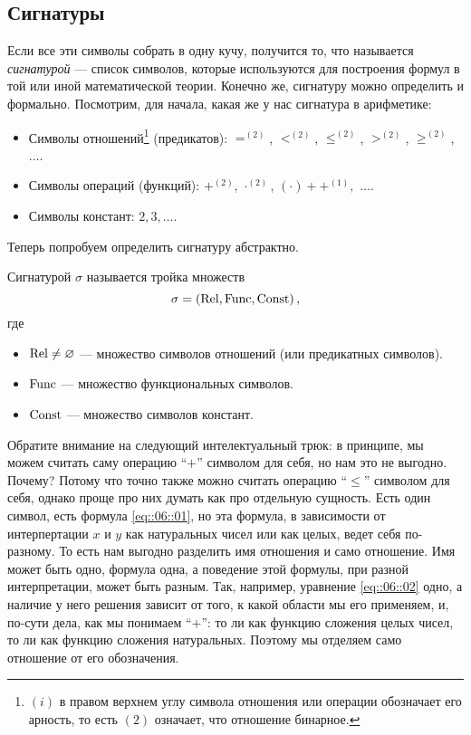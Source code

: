 \subsection{Сигнатуры}

Если все эти символы собрать в одну кучу, получится то, что называется {\it сигнатурой} --- список символов, которые используются для построения формул в той или иной математической теории.
Конечно же, сигнатуру можно определить и формально.
Посмотрим, для начала, какая же у нас сигнатура в арифметике:
\begin{itemize}
    \item Символы отношений\footnote{$(i)$ в правом верхнем углу символа отношения или операции обозначает его арность, то есть $(2)$ означает, что отношение бинарное.} (предикатов): $=^{(2)}$, $<^{(2)}$, $\leqslant^{(2)}$, $>^{(2)}$, $\geqslant^{(2)}$, $\ldots$.
    \item Символы операций (функций): $+^{(2)}$, $\cdot^{(2)}$, $(\cdot)++^{(1)},$ $\ldots$.
    \item Символы констант: $2, 3, \ldots$.
\end{itemize}
Теперь попробуем определить сигнатуру абстрактно.
\begin{definition}
    Сигнатурой $\sigma$ называется тройка множеств
    $$
        \sigma = \left(\mathrm{Rel}, \mathrm{Func}, \mathrm{Const}\right),
    $$
    где
    \begin{itemize}
        \item $\mathrm{Rel} \neq \varnothing$ --- множество символов отношений (или предикатных символов).
        \item $\mathrm{Func}$ --- множество функциональных символов.
        \item $\mathrm{Const}$ --- множество символов констант.
    \end{itemize}
\end{definition}
Обратите внимание на следующий интелектуальный трюк: в принципе, мы можем считать саму операцию \enquote{$+$} символом для себя, но нам это не выгодно.
Почему?
Потому что точно также можно считать операцию \enquote{$\leqslant$} символом для себя, однако проще про них думать как про отдельную сущность.
Есть один символ, есть формула \eqref{eq::06::01}, но эта формула, в зависимости от интерпертации $x$ и $y$ как натуральных чисел или как целых, ведет себя по-разному.
То есть нам выгодно разделить имя отношения и само отношение.
Имя может быть одно, формула одна, а поведение этой формулы, при разной интерпретации, может быть разным.
Так, например, уравнение \eqref{eq::06::02} одно, а наличие у него решения зависит от того, к какой области мы его применяем, и, по-сути дела, как мы понимаем \enquote{$+$}: то ли как функцию сложения целых чисел, то ли как функцию сложения натуральных.
Поэтому мы отделяем само отношение от его обозначения.

